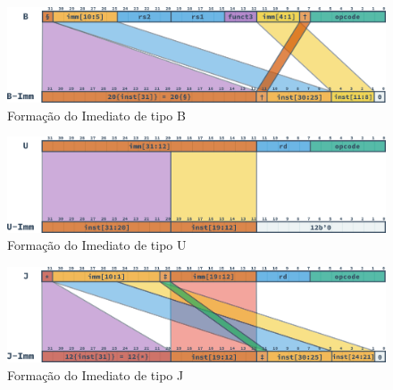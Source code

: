     \begin{figure}[H]
    \centering
        \includegraphics[width=.9\linewidth]
        {../images/instructions/rv32_b_immediate.png}
        \caption{Formação do Imediato de tipo B}\label{fig:riscv_b_imm}
    \end{figure}

    \begin{figure}[H]
    \centering
        \includegraphics[width=.9\linewidth]
        {../images/instructions/rv32_u_immediate.png}
        \caption{Formação do Imediato de tipo U}\label{fig:riscv_u_imm}
    \end{figure}

    \begin{figure}[H]
    \centering
        \includegraphics[width=.9\linewidth]
        {../images/instructions/rv32_j_immediate.png}
        \caption{Formação do Imediato de tipo J}\label{fig:riscv_j_imm}
    \end{figure}


